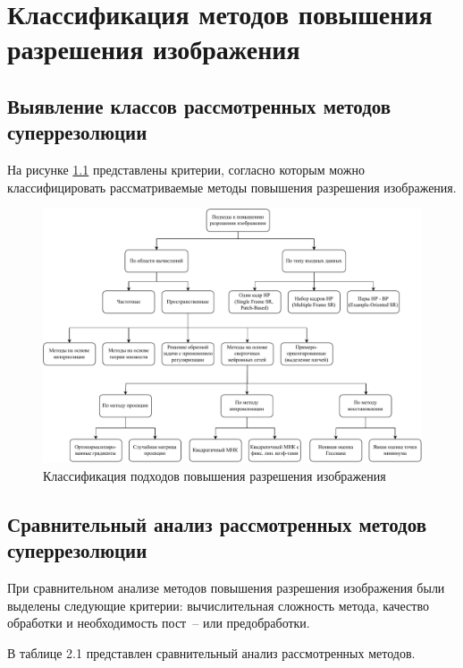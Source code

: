 \chapter{Классификация методов повышения разрешения изображения}

\section{Выявление классов рассмотренных методов суперрезолюции}

На рисунке \ref{class} представлены критерии, согласно которым можно классифицировать рассматриваемые методы повышения разрешения изображения.

\begin{figure}[!h]
	\centering
	\includegraphics[scale=0.65]{assets/class}
	\caption{Классификация подходов повышения разрешения изображения}
	\label{class}
\end{figure}

\section{Сравнительный анализ рассмотренных методов суперрезолюции}

При сравнительном анализе методов повышения разрешения изображения были выделены следующие критерии: вычислительная сложность метода, качество обработки и необходимость пост~-- или предобработки.

В таблице 2.1 представлен сравнительный анализ рассмотренных методов.


